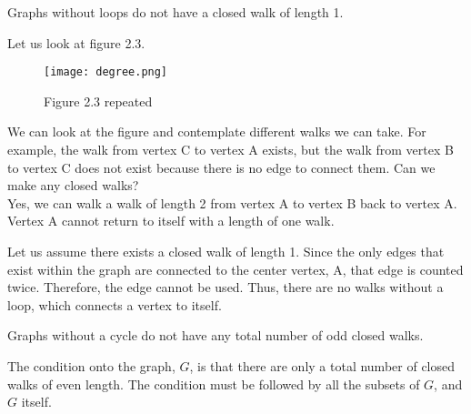 \begin{theorem}
    Graphs without loops do not have a closed walk of length 1.
\end{theorem}
Let us look at figure 2.3. 
\begin{figure}[h]
         \centering
         \texttt{[image: degree.png]}
         \caption{\small{\color{red}Figure 2.3 repeated}}
 \end{figure}
We can look at the figure and contemplate different walks we can take. For example, the walk from vertex C to vertex A exists, but the walk from vertex B to vertex C does not exist because there is no edge to connect them. Can we make any closed walks? \\
Yes, we can walk a walk of length 2 from vertex A to vertex B back to vertex A. Vertex A cannot return to itself with a length of one walk.  
\par Let us assume there exists a closed walk of length 1. Since the only edges that exist within the graph are connected to the center vertex, A, that edge is counted twice.  Therefore, the edge cannot be used.  Thus, there are no walks without a loop, which connects a vertex to itself.
\begin{proposition}
    Graphs without a cycle do not have any total number of odd closed walks.
\end{proposition}
The condition onto the graph, $G$, is that there are only a total number of closed walks of even length. The condition must be followed by all the subsets of $G$, and $G$ itself.

